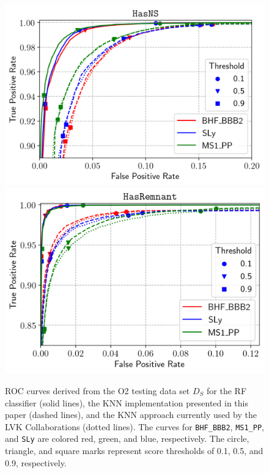 \begin{figure}%
\includegraphics[width=0.47\linewidth]{ROC_O2testing_all_impl-NS}
\includegraphics[width=0.45\linewidth]{ROC_O2testing_all_impl-REM}
\caption{\ac{ROC} curves derived from the \ac{O2} testing data set $D_S$ for the \ac{RF} classifier (solid lines), the \ac{KNN} implementation presented in this paper (dashed lines), and the \ac{KNN} approach currently used by the \ac{LVK} Collaborations (dotted lines). The curves for {\tt BHF\_BBB2}, {\tt MS1\_PP}, and {\tt SLy} are colored red, green, and blue, respectively. The circle, triangle, and square marks represent score thresholds of 0.1, 0.5, and 0.9, respectively.}
\label{fig:rocO2_all}
\end{figure}




